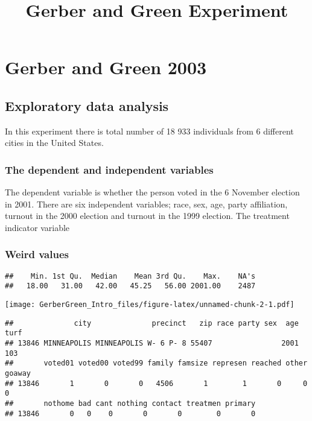 \documentclass[]{article}
\title{Gerber and Green Experiment}
\author{}
\date{}
\begin{document}
\maketitle

\section{Gerber and Green 2003}\label{gerber-and-green-2003}

\subsection{Exploratory data analysis}\label{exploratory-data-analysis}

In this experiment there is total number of 18 933 individuals from 6
different cities in the United States.

\subsubsection{The dependent and independent
variables}\label{the-dependent-and-independent-variables}

The dependent variable is whether the person voted in the 6 November
election in 2001. There are six independent variables; race, sex, age,
party affiliation, turnout in the 2000 election and turnout in the 1999
election. The treatment indicator variable

\subsubsection{Weird values}\label{weird-values}

\begin{verbatim}
##    Min. 1st Qu.  Median    Mean 3rd Qu.    Max.    NA's 
##   18.00   31.00   42.00   45.25   56.00 2001.00    2487
\end{verbatim}

\texttt{[image: GerberGreen\_Intro\_files/figure-latex/unnamed-chunk-2-1.pdf]}

\begin{verbatim}
##              city              precinct   zip race party sex  age turf
## 13846 MINNEAPOLIS MINNEAPOLIS W- 6 P- 8 55407                2001  103
##       voted01 voted00 voted99 family famsize represen reached other goaway
## 13846       1       0       0   4506       1        1       0     0      0
##       nothome bad cant nothing contact treatmen primary
## 13846       0   0    0       0       0        0       0
\end{verbatim}
\end{document}
